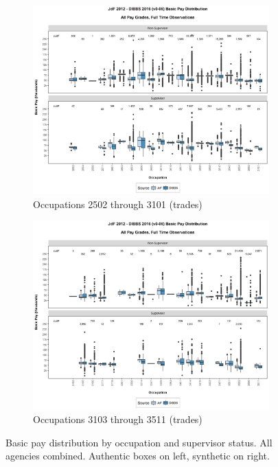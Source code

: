 \documentclass[10pt, letterpaper]{article}
\begin{document}
\begin{spacing}{1.0}
\begin{figure}[h]
    \centering
    \begin{subfigure}{1\textwidth}
        \centering
        \includegraphics[width=6in, trim={0 1in 0 0.75in}, clip]{JdFDIBBSBasicPaySupervisoryStatusOccupation481.png}
        \caption{Occupations 2502 through 3101 (trades)}
        \vspace{10pt}
    \end{subfigure}
    \begin{subfigure}{1\textwidth}
        \centering
        \includegraphics[width=6in, trim={0 1in 0 0.75in}, clip]{JdFDIBBSBasicPaySupervisoryStatusOccupation501.png}
        \caption{Occupations 3103 through 3511 (trades)}
        \vspace{10pt}
    \end{subfigure}
    \caption{Basic pay distribution by occupation and supervisor status.  All agencies combined.  Authentic boxes on left, synthetic on right.}
    \label{figure:JdFDIBBSBasicPaySupervisoryStatusOccupation4}
\end{figure}


\end{spacing}
\end{document}
